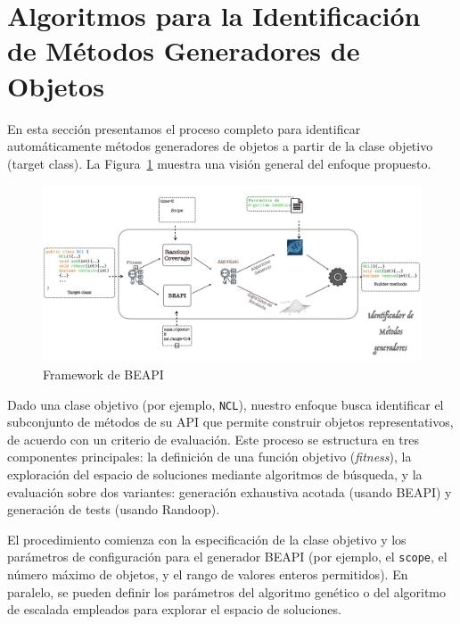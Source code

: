\section{Algoritmos para la Identificación de Métodos Generadores de Objetos}
\label{sec:algorithms}

En esta sección presentamos el proceso completo para identificar automáticamente métodos generadores de objetos a partir de la clase objetivo (target class). 
La Figura~\ref{fig:builders-overview} muestra una visión general del enfoque propuesto.


\begin{figure}[H]
  \centering
  \includegraphics[width=1.0\textwidth]{images/builders.png}
  \caption{Framework de BEAPI}
  \label{fig:builders-overview}
\end{figure}


Dado una clase objetivo (por ejemplo, \texttt{NCL}), nuestro enfoque busca identificar el subconjunto de métodos de su API que permite construir objetos representativos, de acuerdo con un criterio de evaluación. 
Este proceso se estructura en tres componentes principales: la definición de una función objetivo (\emph{fitness}), la exploración del espacio de soluciones mediante algoritmos de búsqueda, 
y la evaluación sobre dos variantes: generación exhaustiva acotada (usando BEAPI) y generación de tests (usando Randoop).

El procedimiento comienza con la especificación de la clase objetivo y los parámetros de configuración para el generador BEAPI (por ejemplo, el \texttt{scope}, el número máximo de objetos, y el rango de valores enteros permitidos). 
En paralelo, se pueden definir los parámetros del algoritmo genético o del algoritmo de escalada empleados para explorar el espacio de soluciones.

